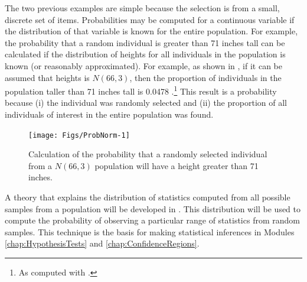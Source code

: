 \documentclass[10pt,openany]{book}\usepackage[]{graphicx}\usepackage[]{color}
\newenvironment{knitrout}{}{} %
\begin{document}
\newpage
The two previous examples are simple because the selection is from a small, discrete set of items. Probabilities may be computed for a continuous variable if the distribution of that variable is known for the entire population. For example, the probability that a random individual is greater than 71 inches tall can be calculated if the distribution of heights for all individuals in the population is known (or reasonably approximated). For example, as shown in , if it can be assumed that heights is $N(66,3)$, then the proportion of individuals in the population taller than 71 inches tall is 0.0478 .\footnote{As computed with .} This result is a probability because (i) the individual was randomly selected and (ii) the proportion of all individuals of interest in the entire population was found.

\begin{knitrout}
\color{fgcolor}\begin{figure}[hbtp]

{\centering \texttt{[image: Figs/ProbNorm-1]} 

}

\caption[Calculation of the probability that a randomly selected individual from a $N(66,3)$ population will have a height greater than 71 inches]{Calculation of the probability that a randomly selected individual from a $N(66,3)$ population will have a height greater than 71 inches.}\label{fig:ProbNorm}
\end{figure}


\end{knitrout}

A theory that explains the distribution of statistics computed from all possible samples from a population will be developed in . This distribution will be used to compute the probability of observing a particular range of statistics from random samples. This technique is the basis for making statistical inferences in Modules \ref{chap:HypothesisTests} and \ref{chap:ConfidenceRegions}.











%    
\end{document}
